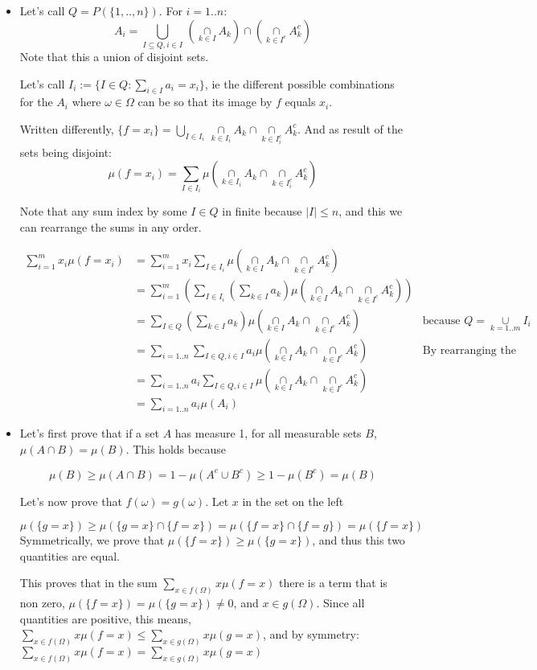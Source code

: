 \documentclass[12pt]{article}
\newcommand{\union}[1]{\underset{#1}{\cup} }
\newcommand{\bigunion}[1]{\underset{#1}{\bigcup} \, }
\newcommand{\inter}[1]{\underset{#1}{\cap} }
\begin{document}
\begin{itemize}

\item
Let's call $Q = P(\{1,..,n\})$. For $i = 1 .. n$:
$$A_i = \bigunion{I \subseteq Q, i \in I} (\inter{k \in I} A_k) \inter{} (\inter{k \in I^c} A_k^c) $$
Note that this a union of disjoint sets.


Let's call $I_i := \{ I \in Q: \sum_{i \in I} a_i = x_i\}$, ie the different possible combinations for the $A_i$ where $\omega \in \Omega$ can be so that its image by $f$ equals $x_i$. 


Written differently, $\{ f = x_i \} = \bigunion{I \in I_i} \inter{k \in I_i} A_k \inter{} \inter{k \in I_i^c} A_k^c$. And as result of the sets being disjoint: 
$$ \mu(f = x_i) = \sum_{I \in I_i} \mu(\inter{k \in I_i} A_k \inter{} \inter{k \in I_i^c} A_k^c)$$


Note that any sum index by some $I \in Q$ in finite because $|I| \leq n$, and this we can rearrange the sums in any order.

\begin{align*}
\sum_{i=1}^m x_i \mu(f = x_i) 
&= \sum_{i=1}^m x_i \sum_{I \in I_i} \mu(\inter{k \in I} A_k \inter{} \inter{k \in I^c} A_k^c) \\
&= \sum_{i=1}^m  \left(\sum_{I \in I_i} (\sum_{k \in I} a_k) \mu(\inter{k \in I} A_k \inter{} \inter{k \in I^c} A_k^c)\right) \\
&= \sum_{I \in Q} (\sum_{k \in I} a_k) \mu(\inter{k \in I} A_k \inter{} \inter{k \in I^c} A_k^c) 
& \text{because $Q = \union{k=1..m} I_i$} \\
&= \sum_{i=1..n} \sum_{I \in Q, i \in I} a_i \mu(\inter{k \in I} A_k \inter{} \inter{k \in I^c} A_k^c) 
& \text{By rearranging the sum}\\
&= \sum_{i=1..n} a_i \sum_{I \in Q, i \in I}  \mu(\inter{k \in I} A_k \inter{} \inter{k \in I^c} A_k^c) \\
&= \sum_{i=1..n} a_i \mu(A_i)
\end{align*}

\item
Let's first prove that if a set $A$ has measure 1, for all measurable sets $B$, $\mu(A \inter{} B) = \mu(B)$. This holds because 

$$\mu(B) \geq \mu(A \inter{} B) = 1 - \mu(A^c \union{} B^c) \geq 1 - \mu(B^c) = \mu(B)$$


Let's now prove that $f(\omega) = g(\omega)$.
Let $x$ in the set on the left

$\mu(\{g = x\}) \geq \mu(\{g = x\} \inter{} \{f=x\}) = \mu(\{f = x\} \inter{} \{f=g\}) = \mu(\{f = x\})$ 
Symmetrically, we prove that $\mu(\{f = x\}) \geq \mu(\{g = x\})$, and thus this two quantities are equal.

This proves that in the sum $\sum_{x \in f(\Omega)} x \mu(f = x)$ there is a term that is non zero, $\mu(\{f = x\}) = \mu(\{g=x\}) \neq 0$, and $x \in g(\Omega)$. Since all quantities are positive, this means, $\sum_{x \in f(\Omega)} x \mu(f = x) \leq \sum_{x \in g(\Omega)} x \mu(g = x)$, and by symmetry: $\sum_{x \in f(\Omega)} x \mu(f = x) = \sum_{x \in g(\Omega)} x \mu(g = x)$


\end{itemize}
\end{document}
